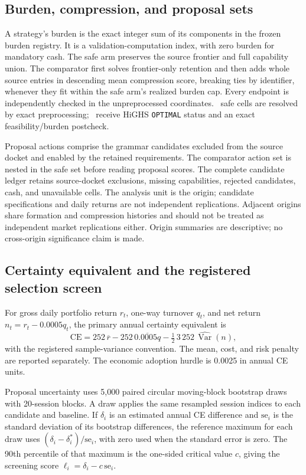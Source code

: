 \subsection{Burden, compression, and proposal sets}

A strategy's burden is the exact integer sum of its components in the frozen
burden registry. It is a validation-computation index, with zero burden for
mandatory cash. The safe arm preserves the source frontier and full capability
union. The comparator first solves frontier-only retention and then adds whole
source entries in descending mean compression score, breaking ties by
identifier, whenever they fit within the safe arm's realized burden cap.
Every endpoint is independently checked in the unpreprocessed coordinates.
\AORPointInTimePreprocessingSolutions\ safe cells are resolved by exact
preprocessing; \AORPointInTimeSolverSolutions\ receive HiGHS
\texttt{OPTIMAL} status and an exact feasibility/burden postcheck.

Proposal actions comprise the grammar candidates excluded from the source
docket and enabled by the retained requirements. The comparator action set is
nested in the safe set before reading proposal scores. The complete candidate
ledger retains source-docket exclusions, missing capabilities, rejected
candidates, cash, and unavailable cells. The analysis unit is the origin;
candidate specifications and daily returns are not independent replications.
Adjacent origins share formation and compression histories and should not be
treated as independent market replications either. Origin summaries are
descriptive; no cross-origin significance claim is made.

\subsection{Certainty equivalent and the registered selection screen}

For gross daily portfolio return \(r_t\), one-way turnover \(q_t\), and
net return \(n_t=r_t-0.0005q_t\), the primary annual certainty equivalent is
\[
 \mathrm{CE}=252\,\overline r
 -252\,\overline{0.0005q}
 -\tfrac12\,3\,252\,\widehat{\operatorname{Var}}(n),
\]
with the registered sample-variance convention. The mean, cost, and risk
penalty are reported separately. The economic adoption hurdle is 0.0025 in
annual CE units.

Proposal uncertainty uses 5,000 paired circular moving-block bootstrap draws
with 20-session blocks. A draw applies the same resampled session indices to
each candidate and baseline. If \(\delta_i\) is an estimated annual CE
difference and \(\mathrm{se}_i\) is the standard deviation of its bootstrap
differences, the reference maximum for each draw uses
\((\delta_i-\delta_i^*)/\mathrm{se}_i\), with zero used when the standard
error is zero. The 90th percentile of that maximum is the one-sided critical
value \(c\), giving the screening score \(\ell_i=\delta_i-c\,\mathrm{se}_i\).

